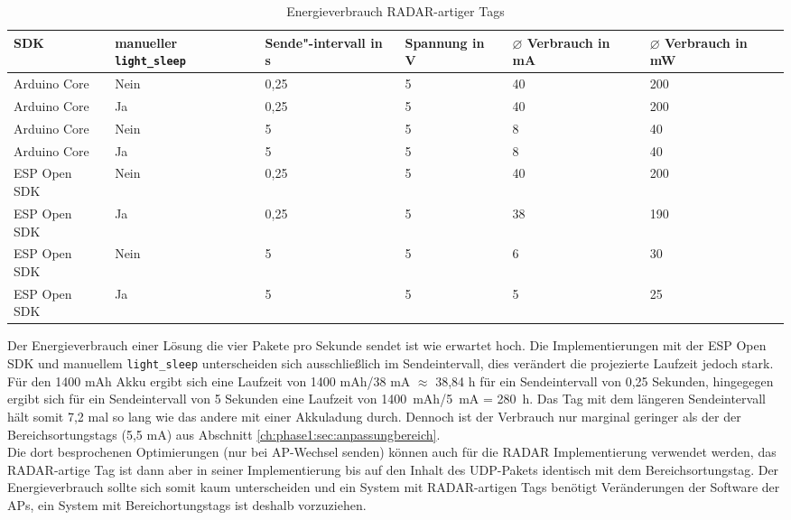 \begin{table}[h]
	\centering
	\caption{Energieverbrauch RADAR-artiger Tags}
	\label{table:radarconsumption}
	\begin{tabular}{p{3cm}|p{2.2cm}|p{1.5cm}|p{2cm}|p{2cm}|p{2cm}}
		SDK & manueller \texttt{light\_sleep} & Sende"-intervall in s & Spannung in V & $\varnothing$ Verbrauch in mA & $\varnothing$ Verbrauch in mW \\
		\hline
		Arduino Core & Nein & 0,25 & 5 & 40 & 200 \\
		Arduino Core & Ja & 0,25 & 5 & 40 & 200 \\
		Arduino Core & Nein & 5 & 5 & 8 & 40 \\
		Arduino Core & Ja & 5 & 5 & 8 & 40 \\
		ESP Open SDK & Nein & 0,25 & 5 & 40 & 200 \\
		ESP Open SDK & Ja & 0,25 & 5 & 38 & 190 \\
		ESP Open SDK & Nein & 5 & 5 & 6 & 30 \\
		ESP Open SDK & Ja & 5 & 5 & 5 & 25 \\
	\end{tabular}
\end{table}

Der Energieverbrauch einer Lösung die vier Pakete pro Sekunde sendet ist wie erwartet hoch.
Die Implementierungen mit der ESP Open SDK und manuellem \texttt{light\_sleep} unterscheiden sich ausschließlich im Sendeintervall, dies verändert die projezierte Laufzeit jedoch stark.
Für den 1400 mAh Akku ergibt sich eine Laufzeit von 1400 mAh/38 mA $\approx$ 38,84 h für ein Sendeintervall von 0,25 Sekunden, hingegegen ergibt sich für ein Sendeintervall von 5 Sekunden eine Laufzeit von 1400\ mAh/5\ mA = 280\ h.
Das Tag mit dem längeren Sendeintervall hält somit 7,2 mal so lang wie das andere mit einer Akkuladung durch. 
Dennoch ist der Verbrauch nur marginal geringer als der der Bereichsortungstags (5,5 mA) aus Abschnitt \ref{ch:phase1:sec:anpassungbereich}. \\
Die dort besprochenen Optimierungen (nur bei AP-Wechsel senden) können auch für die RADAR Implementierung verwendet werden, das RADAR-artige Tag ist dann aber in seiner Implementierung bis auf den Inhalt des UDP-Pakets identisch mit dem Bereichsortungstag.
Der Energieverbrauch sollte sich somit kaum unterscheiden und ein System mit RADAR-artigen Tags benötigt Veränderungen der Software der APs, ein System mit Bereichortungstags ist deshalb vorzuziehen. \\

